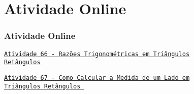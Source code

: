 \section{Atividade Online}
\begin{frame}
\frametitle{Atividade Online} 

\href{https://pt.khanacademy.org/math/trigonometry/trigonometry-right-triangles/intro-to-the-trig-ratios/e/trigonometry_1}
{{\tt Atividade 66 - Razões Trigonométricas em Triângulos\\
Retângulos}}

\href{https://pt.khanacademy.org/math/trigonometry/trigonometry-right-triangles/trig-solve-for-a-side/e/trigonometry_2}
{{\tt Atividade 67 - Como Calcular a Medida de um Lado em\\ Triângulos
Retângulos }}




\end{frame}

